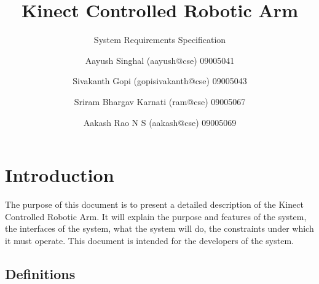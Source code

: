 \documentclass[a4wide]{scrreprt}
\title{Kinect Controlled Robotic Arm}
\subtitle{System Requirements Specification}
\author{Aayush Singhal  (aayush@cse)    09005041 \and
        Sivakanth Gopi  (gopisivakanth@cse) 09005043 \and
        Sriram Bhargav Karnati  (ram@cse)   09005067 \and
        Aakash Rao N S  (aakash@cse)    09005069}
\date{}
\begin{document}
\maketitle

\tableofcontents
\chapter{Introduction}
The purpose of this document is to present a detailed description of the Kinect Controlled Robotic Arm. It will explain the purpose and features of the system, the interfaces of the system, what
the system will do, the constraints under which it must operate. This document is intended for the developers of the system.

\section{Definitions}
\end{document}
